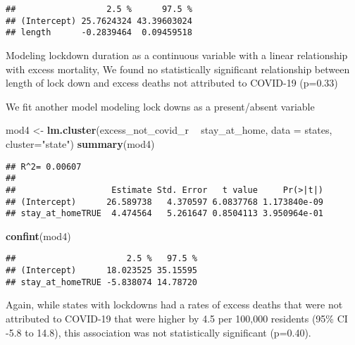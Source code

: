 \documentclass[
]{article}
\newenvironment{Shaded}{\begin{snugshade}}{\end{snugshade}}
\newcommand{\DataTypeTok}[1]{\textcolor[rgb]{0.13,0.29,0.53}{#1}}
\newcommand{\KeywordTok}[1]{\textcolor[rgb]{0.13,0.29,0.53}{\textbf{#1}}}
\newcommand{\NormalTok}[1]{#1}
\newcommand{\OperatorTok}[1]{\textcolor[rgb]{0.81,0.36,0.00}{\textbf{#1}}}
\newcommand{\StringTok}[1]{\textcolor[rgb]{0.31,0.60,0.02}{#1}}
\begin{document}
\begin{verbatim}
##                  2.5 %      97.5 %
## (Intercept) 25.7624324 43.39603024
## length      -0.2839464  0.09459518
\end{verbatim}

Modeling lockdown duration as a continuous variable with a linear
relationship with excess mortality, We found no statistically
significant relationship between length of lock down and excess deaths
not attributed to COVID-19 (p=0.33)

We fit another model modeling lock downs as a present/absent variable

\begin{Shaded}
\begin{Highlighting}[]
\NormalTok{mod4 <-}\StringTok{ }\KeywordTok{lm.cluster}\NormalTok{(excess_not_covid_r }\OperatorTok{~}\StringTok{ }\NormalTok{stay_at_home, }\DataTypeTok{data =}\NormalTok{ states, }\DataTypeTok{cluster=}\StringTok{"state"}\NormalTok{)}
\KeywordTok{summary}\NormalTok{(mod4)}
\end{Highlighting}
\end{Shaded}

\begin{verbatim}
## R^2= 0.00607 
## 
##                   Estimate Std. Error   t value     Pr(>|t|)
## (Intercept)      26.589738   4.370597 6.0837768 1.173840e-09
## stay_at_homeTRUE  4.474564   5.261647 0.8504113 3.950964e-01
\end{verbatim}

\begin{Shaded}
\begin{Highlighting}[]
\KeywordTok{confint}\NormalTok{(mod4) }
\end{Highlighting}
\end{Shaded}

\begin{verbatim}
##                      2.5 %   97.5 %
## (Intercept)      18.023525 35.15595
## stay_at_homeTRUE -5.838074 14.78720
\end{verbatim}

Again, while states with lockdowns had a rates of excess deaths that
were not attributed to COVID-19 that were higher by 4.5 per 100,000
residents (95\% CI -5.8 to 14.8), this association was not statistically
significant (p=0.40).
\end{document}
